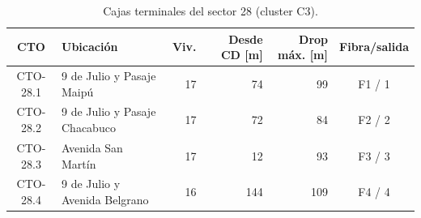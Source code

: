 \begin{table}[H]\centering\footnotesize
\caption{Cajas terminales del sector 28 (cluster C3).}\label{tab:sector28}
\begin{tabular}{|c|p{4.0cm}|r|r|r|c|}\hline \textbf{CTO} & \textbf{Ubicación} & \textbf{Viv.} & \textbf{Desde CD [m]} & \textbf{Drop máx. [m]} & \textbf{Fibra/salida} \\ \hline
CTO-28.1 & 9 de Julio y Pasaje Maipú & 17 & 74 & 99 & F1 / 1 \\ \hline
CTO-28.2 & 9 de Julio y Pasaje Chacabuco & 17 & 72 & 84 & F2 / 2 \\ \hline
CTO-28.3 & Avenida San Martín & 17 & 12 & 93 & F3 / 3 \\ \hline
CTO-28.4 & 9 de Julio y Avenida Belgrano & 16 & 144 & 109 & F4 / 4 \\ \hline
\end{tabular}\end{table}
